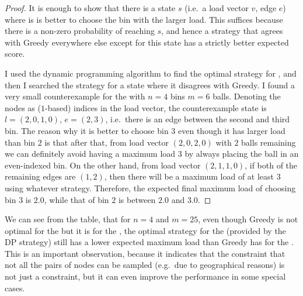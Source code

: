 \begin{proof}
It is enough to show that there is a state $s$ (i.e.\ a load vector $v$, edge $e$) where is is better to choose the bin with the larger load. This suffices because there is a non-zero probability of reaching $s$, and hence a strategy that agrees with Greedy everywhere else except for this state has a strictly better expected score.


I used the dynamic programming algorithm to find the optimal strategy for \GraphicalTwoChoice, and then I searched the strategy for a state where it disagrees with Greedy. I found a very small counterexample for the \CycleGraph with $n=4$ bins $m=6$ balls. Denoting the nodes as ($1$-based) indices in the load vector, the counterexample state is $l=(2,0,1,0)$,  $e=(2,3)$, i.e.\ there is an edge between the second and third bin. The reason why it is better to choose bin $3$ even though it has larger load than bin $2$ is that after that, from load vector $(2,0,2,0)$ with $2$ balls remaining we can definitely avoid having a maximum load $3$ by always placing the ball in an even-indexed bin. On the other hand, from load vector $(2,1,1,0)$, if both of the remaining edges are $(1,2)$, then there will be a maximum load of at least $3$ using whatever strategy. Therefore, the expected final maximum load of choosing bin $3$ is $2.0$, while that of bin $2$ is between $2.0$ and $3.0$.
\end{proof}



We can see from the table, that for $n=4$ and $m=25$, even though Greedy is not optimal for the \CycleGraph but it is for the \CompleteGraph, the optimal strategy for the \CycleGraph (provided by the DP strategy) still has a lower expected maximum load than Greedy has for the \CompleteGraph. This is an important observation, because it indicates that the constraint that not all the pairs of nodes can be sampled (e.g.\ due to geographical reasons) is not just a constraint, but it can even improve the performance in some special cases.


